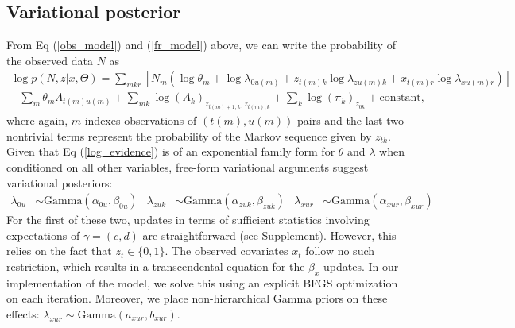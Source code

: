 \documentclass[12pt,a4paper]{article}
\begin{document}
\subsection*{Variational posterior}
From Eq (\ref{obs_model}) and (\ref{fr_model}) above, we can write the probability of the observed data $N$ as
\begin{multline}
    \label{log_evidence}
    \log p(N, z|x, \Theta) = \sum_{mkr} \left[
        N_m \left( \log \theta_m +
            \log \lambda_{0u(m)} +
            z_{t(m) k} \log \lambda_{zu(m) k} +
            x_{t(m) r} \log \lambda_{xu(m) r}
            \right)
    \right] \\
    - \sum_m \theta_m \Lambda_{t(m) u(m)} +
    \sum_{mk} \log (A_k)_{z_{t(m)+1, k}, z_{t(m), k}} +
    \sum_k \log (\pi_k)_{z_{0k}} + \text{constant,}
\end{multline}
where again, $m$ indexes observations of $(t(m),u(m))$ pairs and the last two nontrivial terms represent the probability of the Markov sequence given by $z_{tk}$. Given that Eq (\ref{log_evidence}) is of an exponential family form for $\theta$ and $\lambda$ when conditioned on all other variables, free-form variational arguments \cite{Wainwright2008-ii} suggest variational posteriors:
\begin{align}
    \lambda_{0u} &\sim \text{Gamma}(\alpha_{0u}, \beta_{0u}) &
    \lambda_{zuk} &\sim \text{Gamma}(\alpha_{zuk}, \beta_{zuk}) &
    \lambda_{xur} &\sim \text{Gamma}(\alpha_{xur}, \beta_{xur})
\end{align}
For the first of these two, updates in terms of sufficient statistics involving expectations of $\gamma = (c, d)$ are straightforward (see Supplement). However, this relies on the fact that $z_t \in \lbrace0, 1\rbrace$. The observed covariates $x_t$ follow no such restriction, which results in a transcendental equation for the $\beta_x$ updates. In our implementation of the model, we solve this using an explicit BFGS optimization on each iteration. Moreover, we place non-hierarchical Gamma priors on these effects: $\lambda_{xur} \sim \text{Gamma}(a_{xur}, b_{xur})$.
\end{document}
